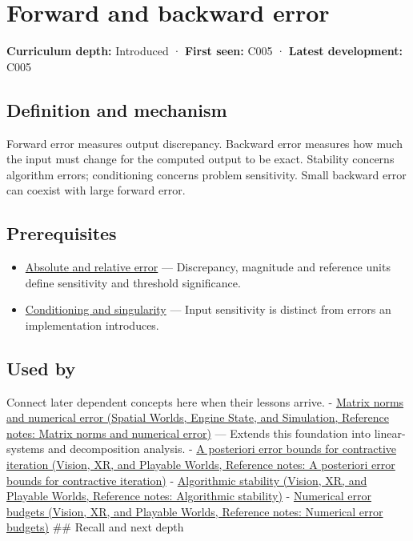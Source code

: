 \hypertarget{appendix-a7fbaf6d1b1c}{}\label{referencestart:appendix-a7fbaf6d1b1c}
\section{Forward and backward error}\label{appendix-a7fbaf6d1b1c-forward-and-backward-error}

\textbf{Curriculum depth:} Introduced · \textbf{First seen:} C005 · \textbf{Latest development:} C005

\subsection{Definition and mechanism}\label{appendix-a7fbaf6d1b1c-definition-and-mechanism}

Forward error measures output discrepancy. Backward error measures how much the input must change for the computed output to be exact. Stability concerns algorithm errors; conditioning concerns problem sensitivity. Small backward error can coexist with large forward error.

\subsection{Prerequisites}\label{appendix-a7fbaf6d1b1c-prerequisites}

\begin{itemize}
\tightlist
\item
  \hyperref[appendix-3ae74e89b4e6]{Absolute and relative error} --- Discrepancy, magnitude and reference units define sensitivity and threshold significance.
\item
  \hyperref[appendix-8f6a01f284a7]{Conditioning and singularity} --- Input sensitivity is distinct from errors an implementation introduces.
\end{itemize}

\subsection{Used by}\label{appendix-a7fbaf6d1b1c-used-by}

Connect later dependent concepts here when their lessons arrive. - \href{../05-Spatial-Worlds-Engine-State-and-Simulation/main.pdf\#nameddest=appendix-f8657bac66e5}{Matrix norms and numerical error (Spatial Worlds, Engine State, and Simulation, Reference notes: Matrix norms and numerical error)} --- Extends this foundation into linear-systems and decomposition analysis. - \href{../07-Vision-XR-and-Playable-Worlds/main.pdf\#nameddest=appendix-d83b0ad1be7f}{A posteriori error bounds for contractive iteration (Vision, XR, and Playable Worlds, Reference notes: A posteriori error bounds for contractive iteration)} - \href{../07-Vision-XR-and-Playable-Worlds/main.pdf\#nameddest=appendix-aa2bf0d79639}{Algorithmic stability (Vision, XR, and Playable Worlds, Reference notes: Algorithmic stability)} - \href{../07-Vision-XR-and-Playable-Worlds/main.pdf\#nameddest=appendix-31b8c295e05f}{Numerical error budgets (Vision, XR, and Playable Worlds, Reference notes: Numerical error budgets)} \#\# Recall and next depth

